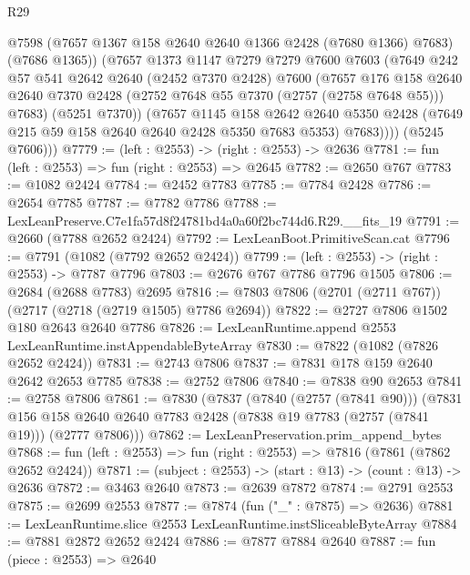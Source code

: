 \begin{lexlean}{R29}
\begin{coremodule}
              @7598
              (@7657 @1367 @158 @2640 @2640 @1366 @2428 (@7680 @1366) @7683)
              (@7686 @1365))
            (@7657
              @1373
              @1147
              @7279
              @7279
              @7600
              @7603
              (@7649
                @242
                @57
                @541
                @2642
                @2640
                (@2452 @7370 @2428)
                @7600
                (@7657
                  @176
                  @158
                  @2640
                  @2640
                  @7370
                  @2428
                  (@2752 @7648 @55 @7370 (@2757 (@2758 @7648 @55)))
                  @7683)
                (@5251 @7370))
              (@7657
                @1145
                @158
                @2642
                @2640
                @5350
                @2428
                (@7649 @215 @59 @158 @2640 @2640 @2428 @5350 @7683 @5353)
                @7683))))
        (@5245 @7606)))
@7779 := (left : @2553) -> (right : @2553) -> @2636
@7781 := fun (left : @2553) => fun (right : @2553) => @2645
@7782 := @2650 @767
@7783 := @1082 @2424
@7784 := @2452 @7783
@7785 := @7784 @2428
@7786 := @2654 @7785
@7787 := @7782 @7786
@7788 := LexLeanPreserve.C7e1fa57d8f24781bd4a0a60f2bc744d6.R29.__fits_19
@7791 := @2660 (@7788 @2652 @2424)
@7792 := LexLeanBoot.PrimitiveScan.cat
@7796 := @7791 (@1082 (@7792 @2652 @2424))
@7799 := (left : @2553) -> (right : @2553) -> @7787 @7796
@7803 := @2676 @767 @7786 @7796 @1505
@7806 := @2684 (@2688 @7783) @2695
@7816 := @7803 @7806 (@2701 (@2711 @767)) (@2717 (@2718 (@2719 @1505) @7786 @2694))
@7822 := @2727 @7806 @1502 @180 @2643 @2640 @7786
@7826 := LexLeanRuntime.append @2553 LexLeanRuntime.instAppendableByteArray
@7830 := @7822 (@1082 (@7826 @2652 @2424))
@7831 := @2743 @7806
@7837 := @7831 @178 @159 @2640 @2642 @2653 @7785
@7838 := @2752 @7806
@7840 := @7838 @90 @2653
@7841 := @2758 @7806
@7861 := @7830
    (@7837
      (@7840 (@2757 (@7841 @90)))
      (@7831 @156 @158 @2640 @2640 @7783 @2428 (@7838 @19 @7783 (@2757 (@7841 @19))) (@2777 @7806)))
@7862 := LexLeanPreservation.prim_append_bytes
@7868 := fun (left : @2553) => fun (right : @2553) => @7816 (@7861 (@7862 @2652 @2424))
@7871 := (subject : @2553) -> (start : @13) -> (count : @13) -> @2636
@7872 := @3463 @2640
@7873 := @2639 @7872
@7874 := @2791 @2553
@7875 := @2699 @2553
@7877 := @7874 (fun ("_" : @7875) => @2636)
@7881 := LexLeanRuntime.slice @2553 LexLeanRuntime.instSliceableByteArray
@7884 := @7881 @2872 @2652 @2424
@7886 := @7877 @7884 @2640
@7887 := fun (piece : @2553) => @2640

\end{coremodule}
\end{lexlean}
